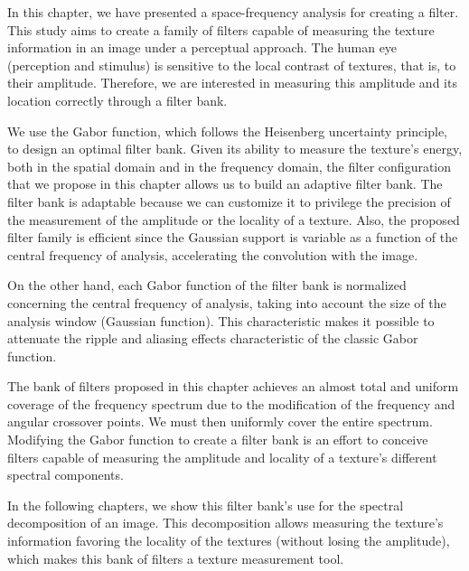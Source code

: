 In this chapter, we have presented a space-frequency analysis for creating a filter. This study aims to create a family of filters capable of measuring the texture information in an image under a perceptual approach. The human eye (perception and stimulus) is sensitive to the local contrast of textures, that is, to their amplitude. Therefore, we are interested in measuring this amplitude and its location correctly through a filter bank.

We use the Gabor function, which follows the Heisenberg uncertainty principle, to design an optimal filter bank. Given its ability to measure the texture's energy, both in the spatial domain and in the frequency domain, the filter configuration that we propose in this chapter allows us to build an adaptive filter bank. The filter bank is adaptable because we can customize it to privilege the precision of the measurement of the amplitude or the locality of a texture. Also, the proposed filter family is efficient since the Gaussian support is variable as a function of the central frequency of analysis, accelerating the convolution with the image.

On the other hand, each Gabor function of the filter bank is normalized concerning the central frequency of analysis, taking into account the size of the analysis window (Gaussian function). This characteristic makes it possible to attenuate the ripple and aliasing effects characteristic of the classic Gabor function.

The bank of filters proposed in this chapter achieves an almost total and uniform coverage of the frequency spectrum due to the modification of the frequency and angular crossover points.
We must then uniformly cover the entire spectrum. Modifying the Gabor function to create a filter bank is an effort to conceive filters capable of measuring the amplitude and locality of a texture's different spectral components. 

In the following chapters, we show this filter bank's use for the spectral decomposition of an image. This decomposition allows measuring the texture's information favoring the locality of the textures (without losing the amplitude), which makes this bank of filters a texture measurement tool.